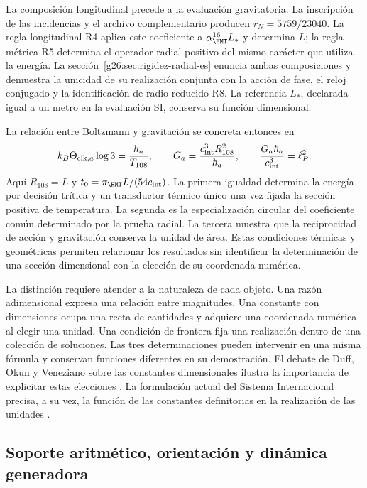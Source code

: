 La composición longitudinal precede a la evaluación gravitatoria.
La inscripción de las incidencias y el archivo complementario producen
\(r_N=5759/23040\). La regla longitudinal R4 aplica este coeficiente
a \(\alpha_{\HMT}^{16}L_*\) y determina \(L\); la regla métrica
R5 determina el operador radial positivo del mismo carácter que utiliza
la energía. La sección~\ref{g26:sec:rigidez-radial-es} enuncia ambas
composiciones y demuestra la unicidad de su realización conjunta con
la acción de fase, el reloj conjugado y la identificación de radio
reducido R8. La referencia \(L_*\), declarada igual a un metro en la
evaluación SI, conserva su función dimensional.

La relación entre Boltzmann y gravitación se concreta entonces en
\[
 k_B\Theta_{{\rm clk},a}\log3=\frac{h_a}{T_{108}},\qquad
 G_a=\frac{c_{\rm int}^3R_{108}^2}{\hbar_a},\qquad
 \frac{G_a\hbar_a}{c_{\rm int}^3}=\ell_P^2.
\]
Aquí \(R_{108}=L\) y \(t_0=\pi_{\HMT}L/(54c_{\rm int})\).
La primera igualdad determina la energía por decisión trítica y un
transductor térmico único una vez fijada la sección positiva de
temperatura. La segunda es la especialización circular del coeficiente
común determinado por la prueba radial. La tercera muestra
que la reciprocidad de acción y gravitación conserva la unidad de
área. Estas condiciones térmicas y geométricas permiten relacionar
los resultados sin identificar la determinación de una sección
dimensional con la elección de su coordenada numérica.

La distinción requiere atender a la naturaleza de cada objeto. Una razón
adimensional expresa una relación entre magnitudes. Una constante con
dimensiones ocupa una recta de cantidades y adquiere una coordenada numérica
al elegir una unidad. Una condición de frontera fija una realización dentro
de una colección de soluciones. Las tres determinaciones pueden intervenir
en una misma fórmula y conservan funciones diferentes en su demostración.
El debate de Duff, Okun y Veneziano sobre las constantes dimensionales
ilustra la importancia de explicitar estas elecciones
\cite{duffokunveneziano}. La formulación actual del Sistema Internacional
precisa, a su vez, la función de las constantes definitorias en la
realización de las unidades \cite{bipm2018,bipmbrochure}.

\subsection{Soporte aritmético, orientación y dinámica generadora}


